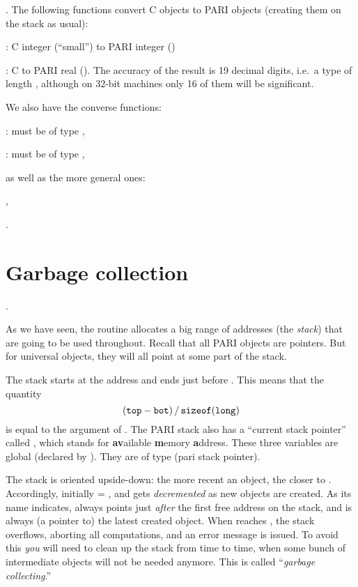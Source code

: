 .
The following functions convert C objects to PARI objects (creating them on
the stack as usual):

: C  integer  (``small'') to PARI integer
()

: C  to PARI real (). The
accuracy of the result is 19 decimal digits, i.e.~a type  of
length , although on 32-bit machines only 16 of them will
be significant.

\noindent We also have the converse functions:

:  must be of type ,

:  must be of type ,

\noindent as well as the more general ones:

,

.

\section{Garbage collection}\label{se:garbage}

.

\noindent
As we have seen, the  routine allocates a big range of
addresses (the \emph{stack}) that are going to be used throughout. Recall
that all PARI objects are pointers. But for universal objects, they will all
point at some part of the stack.

The stack starts at the address  and ends just before . This
means that the quantity
%
$$ ({\tt top} - {\tt bot})\,/\,{\tt sizeof(long)} $$
%
is equal to the  argument of . The PARI
stack also has a ``current stack pointer'' called , which
stands for {\bf av}ailable {\bf m}emory {\bf a}ddress. These three variables
are global (declared by ). They are of type  (pari
stack pointer).

The stack is oriented upside-down: the more recent an object, the closer to
. Accordingly, initially  = , and  gets
\emph{decremented} as new objects are created. As its name indicates,
 always points just \emph{after} the first free address on the
stack, and  is always (a pointer to) the latest created object.
When  reaches , the stack overflows, aborting all
computations, and an error message is issued. To avoid this \emph{you} will
need to clean up the stack from time to time, when some bunch of intermediate
objects will not be needed anymore. This is called ``\emph{garbage
collecting}.''

